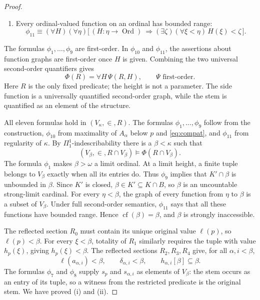 \documentclass[11pt,a4paper]{amsart}
\theoremstyle{definition}
\theoremstyle{remark}
\DeclareMathOperator{\Ord}{Ord}
\begin{document}
\begin{proof}
\begin{enumerate}[label=\textup{(\alph*)}]
\[\begin{split}
                         h_{\alpha,i}(\xi)\leq s(\xi)]\bigr)\,\bigr].
\end{split}
\]
\item Every ordinal-valued function on an ordinal has
bounded range:
\[
 \phi_{11}\equiv (\forall H)(\forall\eta)\bigl[\,
   (H:\eta\to\Ord)\ \Longrightarrow
   (\exists\zeta)(\forall\xi<\eta)\,H(\xi)<\zeta
   \,\bigr].
\]
\end{enumerate}
The formulas \(\phi_1,\ldots,\phi_9\) are first-order.
In \(\phi_{10}\) and \(\phi_{11}\), the assertions
about function graphs are first-order once \(H\) is given. Combining
the two universal second-order quantifiers gives
\begin{equation}\label{eq:reflection-sentence}
 \Phi(R)=\forall H\,\Psi(R,H),
 \qquad\Psi\text{ first-order}.
\end{equation}
Here \(R\) is the only fixed predicate; the height is not a
parameter. The side function is a universally quantified second-order
graph, while the stem is quantified as an element of the structure.

All eleven formulas hold in \((V_\kappa,\in,R)\).
The formulas \(\phi_1,\ldots,\phi_9\)
follow from the construction, \(\phi_{10}\) from maximality of \(A_\alpha\)
below \(p\) and \eqref{eq:compat}, and \(\phi_{11}\) from regularity of
\(\kappa\). By \(\Pi^1_1\)-indescribability there is a
\(\beta<\kappa\) such that
\[
 (V_\beta,\in,R\cap V_\beta)\models\Phi(R\cap V_\beta).
\]
The formula \(\phi_1\) makes \(\beta>\omega\) a limit ordinal. At a limit
height, a finite tuple belongs to \(V_\beta\) exactly when all
its entries do. Thus \(\phi_9\) implies that \(K'\cap\beta\)
is unbounded in \(\beta\). Since \(K'\) is closed,
\(\beta\in K'\subseteq K\cap B\), so \(\beta\) is an
uncountable strong-limit cardinal. For every \(\eta<\beta\),
the graph of every function from \(\eta\) to \(\beta\) is a
subset of \(V_\beta\). Under full second-order semantics,
\(\phi_{11}\) says that all these functions have bounded range.
Hence \(\operatorname{cf}(\beta)=\beta\), and \(\beta\) is
strongly inaccessible.

The reflected section \(R_0\) must contain its unique original
value \(\ell(p)\), so \(\ell(p)<\beta\). For every
\(\xi<\beta\), totality of \(R_1\) similarly requires the
tuple with value \(h_p(\xi)\), giving \(h_p(\xi)<\beta\).
The reflected sections \(R_2,R_3,R_4\) give, for all
\(\alpha,i<\beta\),
\[
 \ell(a_{\alpha,i})<\beta,\qquad
 \delta_{\alpha,i}<\beta,\qquad
 h_{\alpha,i}[\beta]\subseteq\beta.
\]
The formulas \(\phi_7\) and \(\phi_8\) supply
\(s_p\) and \(s_{\alpha,i}\) as elements
of \(V_\beta\): the stem occurs as an entry of its tuple, so a
witness from the restricted predicate is the original stem. We have
proved (i) and (ii).


\end{proof}
\end{document}
